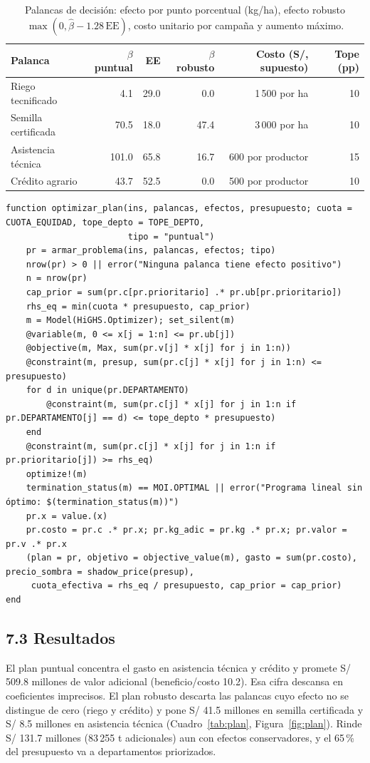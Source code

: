 \documentclass[letterpaper]{report}
\begin{document}
\begin{article}
\begin{table}[htbp]
\centering
\small
\caption{Palancas de decisión: efecto por punto porcentual (kg/ha), efecto robusto $\max(0,\hat\beta-1.28\,\mathrm{EE})$, costo unitario por campaña y aumento máximo.}\label{tab:palancas}
\begin{tabular}{lrrrrr}
\toprule
Palanca & $\beta$ puntual & EE & $\beta$ robusto & Costo (S/, supuesto) & Tope (pp) \\
\midrule
Riego tecnificado & 4.1 & 29.0 & 0.0 & 1\,500 por ha & 10 \\
Semilla certificada & 70.5 & 18.0 & 47.4 & 3\,000 por ha & 10 \\
Asistencia técnica & 101.0 & 65.8 & 16.7 & 600 por productor & 15 \\
Crédito agrario & 43.7 & 52.5 & 0.0 & 500 por productor & 10 \\
\bottomrule
\end{tabular}
\end{table}
\begin{Verbatim}[fontsize=\scriptsize, frame=single, framesep=2mm, label={\small Programa lineal con JuMP + HiGHS}]
function optimizar_plan(ins, palancas, efectos, presupuesto; cuota = CUOTA_EQUIDAD, tope_depto = TOPE_DEPTO,
                        tipo = "puntual")
    pr = armar_problema(ins, palancas, efectos; tipo)
    nrow(pr) > 0 || error("Ninguna palanca tiene efecto positivo")
    n = nrow(pr)
    cap_prior = sum(pr.c[pr.prioritario] .* pr.ub[pr.prioritario])
    rhs_eq = min(cuota * presupuesto, cap_prior)
    m = Model(HiGHS.Optimizer); set_silent(m)
    @variable(m, 0 <= x[j = 1:n] <= pr.ub[j])
    @objective(m, Max, sum(pr.v[j] * x[j] for j in 1:n))
    @constraint(m, presup, sum(pr.c[j] * x[j] for j in 1:n) <= presupuesto)
    for d in unique(pr.DEPARTAMENTO)
        @constraint(m, sum(pr.c[j] * x[j] for j in 1:n if pr.DEPARTAMENTO[j] == d) <= tope_depto * presupuesto)
    end
    @constraint(m, sum(pr.c[j] * x[j] for j in 1:n if pr.prioritario[j]) >= rhs_eq)
    optimize!(m)
    termination_status(m) == MOI.OPTIMAL || error("Programa lineal sin óptimo: $(termination_status(m))")
    pr.x = value.(x)
    pr.costo = pr.c .* pr.x; pr.kg_adic = pr.kg .* pr.x; pr.valor = pr.v .* pr.x
    (plan = pr, objetivo = objective_value(m), gasto = sum(pr.costo), precio_sombra = shadow_price(presup),
     cuota_efectiva = rhs_eq / presupuesto, cap_prior = cap_prior)
end
\end{Verbatim}
\subsection{7.3 Resultados}
El plan puntual concentra el gasto en asistencia técnica y crédito y promete S/ 509.8 millones de valor adicional (beneficio/costo 10.2). Esa cifra descansa en coeficientes imprecisos. El plan robusto descarta las palancas cuyo efecto no se distingue de cero (riego y crédito) y pone S/ 41.5 millones en semilla certificada y S/ 8.5 millones en asistencia técnica (Cuadro~\ref{tab:plan}, Figura~\ref{fig:plan}). Rinde S/ 131.7 millones (83\,255 t adicionales) aun con efectos conservadores, y el 65\,\% del presupuesto va a departamentos priorizados.


\end{article}
\end{document}
